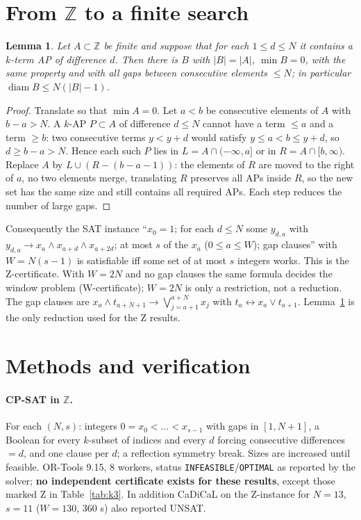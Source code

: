 \documentclass[11pt]{article}
\newtheorem{lemma}{Lemma}
\begin{document}
\section{From $\mathbb Z$ to a finite search}
\begin{lemma}\label{lem:gap}
Let $A\subset\mathbb Z$ be finite and suppose that for each $1\le d\le N$ it contains a $k$-term AP of difference $d$. Then there is $B$ with $|B|=|A|$, $\min B=0$, with the same property and with all gaps between consecutive elements $\le N$; in particular $\operatorname{diam}B\le N(|B|-1)$.
\end{lemma}
\begin{proof}
Translate so that $\min A=0$. Let $a<b$ be consecutive elements of $A$ with $b-a>N$. A $k$-AP $P\subset A$ of difference $d\le N$ cannot have a term $\le a$ and a term $\ge b$: two consecutive terms $y<y+d$ would satisfy $y\le a<b\le y+d$, so $d\ge b-a>N$. Hence each such $P$ lies in $L=A\cap(-\infty,a]$ or in $R=A\cap[b,\infty)$. Replace $A$ by $L\cup(R-(b-a-1))$: the elements of $R$ are moved to the right of $a$, no two elements merge, translating $R$ preserves all APs inside $R$, so the new set has the same size and still contains all required APs. Each step reduces the number of large gaps.
\end{proof}
Consequently the SAT instance ``$x_0=1$; for each $d\le N$ some $y_{d,a}$ with $y_{d,a}\to x_a\wedge x_{a+d}\wedge x_{a+2d}$; at most $s$ of the $x_a$ ($0\le a\le W$); gap clauses'' with $W=N(s-1)$ is satisfiable iff some set of at most $s$ integers works. This is the Z-certificate. With $W=2N$ and no gap clauses the same formula decides the window problem (W-certificate); $W=2N$ is only a restriction, not a reduction. The gap clauses are $x_a\wedge t_{a+N+1}\to\bigvee_{j=a+1}^{a+N}x_j$ with $t_a\leftrightarrow x_a\vee t_{a+1}$. Lemma~\ref{lem:gap} is the only reduction used for the Z results.

\section{Methods and verification}
\paragraph{CP-SAT in $\mathbb Z$.} For each $(N,s)$: integers $0=x_0<\dots<x_{s-1}$ with gaps in $[1,N+1]$, a Boolean for every $k$-subset of indices and every $d$ forcing consecutive differences $=d$, and one clause per $d$; a reflection symmetry break. Sizes are increased until feasible. OR-Tools 9.15, 8 workers, status \texttt{INFEASIBLE}/\texttt{OPTIMAL} as reported by the solver; \textbf{no independent certificate exists for these results}, except those marked Z in Table~\ref{tab:k3}. In addition CaDiCaL on the Z-instance for $N=13$, $s=11$ ($W=130$, 360 s) also reported UNSAT.
\end{document}
